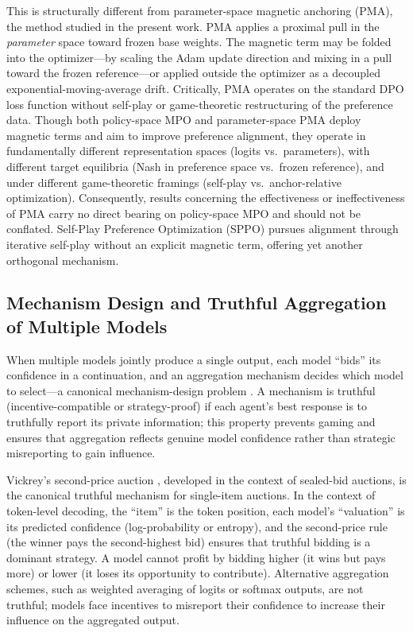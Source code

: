 This is structurally different from parameter-space magnetic anchoring (PMA), the method studied in the present
work.
PMA applies a proximal pull in the \emph{parameter} space toward frozen base weights.
The magnetic term may be folded into the optimizer---by scaling the Adam update direction and mixing in a pull
toward the frozen reference---or applied outside the optimizer as a decoupled exponential-moving-average drift.
Critically, PMA operates on the standard DPO loss function without self-play or game-theoretic restructuring of
the preference data.
Though both policy-space MPO and parameter-space PMA deploy magnetic terms and aim to improve preference
alignment, they operate in fundamentally different representation spaces (logits vs.~parameters), with
different target equilibria (Nash in preference space vs.~frozen reference), and under different game-theoretic
framings (self-play vs.~anchor-relative optimization).
Consequently, results concerning the effectiveness or ineffectiveness of PMA carry no direct bearing on
policy-space MPO and should not be conflated.
Self-Play Preference Optimization (SPPO) \citep{Wu2024} pursues alignment through iterative self-play without
an explicit magnetic term, offering yet another orthogonal mechanism.

\subsection{Mechanism Design and Truthful Aggregation of Multiple Models}

When multiple models jointly produce a single output, each model ``bids'' its confidence in a continuation,
and an aggregation mechanism decides which model to select---a canonical mechanism-design problem
\citep{Duetting2024}.
A mechanism is truthful (incentive-compatible or strategy-proof) if each agent's best response is to
truthfully report its private information; this property prevents gaming and ensures that aggregation reflects
genuine model confidence rather than strategic misreporting to gain influence.

Vickrey's second-price auction \citep{Vickrey1961}, developed in the context of sealed-bid auctions, is the
canonical truthful mechanism for single-item auctions.
In the context of token-level decoding, the ``item'' is the token position, each model's ``valuation'' is its
predicted confidence (log-probability or entropy), and the second-price rule (the winner pays the
second-highest bid) ensures that truthful bidding is a dominant strategy.
A model cannot profit by bidding higher (it wins but pays more) or lower (it loses its opportunity to
contribute).
Alternative aggregation schemes, such as weighted averaging of logits or softmax outputs, are not truthful;
models face incentives to misreport their confidence to increase their influence on the aggregated output.

